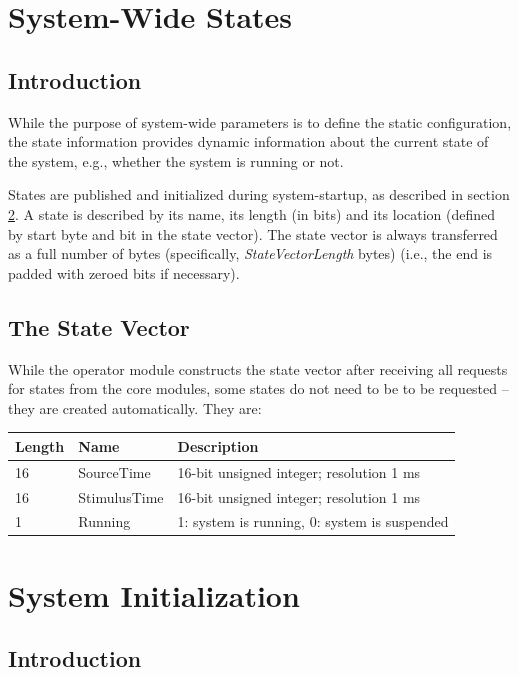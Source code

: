 \documentclass[letterpaper,oneside,12pt]{book}
\begin{document}
\section{System-Wide States}
\label{states}

\subsection{Introduction}

While the purpose of system-wide parameters is to define the static 
configuration, the state information provides dynamic information about the 
current state of the system, e.g., whether the system is running or not.

States are published and initialized during system-startup, as described in 
section \ref{system_init}. A state is described by its name, its length (in 
bits) and its location (defined by start byte and bit in the state vector). 
The state vector is always transferred as a full number of bytes (specifically, 
\textit{StateVectorLength} bytes) (i.e., the end is padded with zeroed 
bits if necessary).

\subsection{The State Vector}

While the operator module constructs the state vector after receiving 
all requests for states from the core modules, some states do not need to be
to be requested -- they are created automatically. They are:
\\[2ex]
\begin{tabular}{|l|l|l|}
 \hline
 \textbf{Length} & \textbf{Name} & \textbf{Description}\\
 \hline
 16 & SourceTime & 16-bit unsigned integer; resolution 1 ms \\  
 \hline
 16 & StimulusTime & 16-bit unsigned integer; resolution 1 ms \\  
 \hline
 1 & Running & 1: system is running, 0: system is suspended\\  
 \hline
\end{tabular}


\section{System Initialization}
\label{system_init}

\subsection{Introduction}
\end{document}

